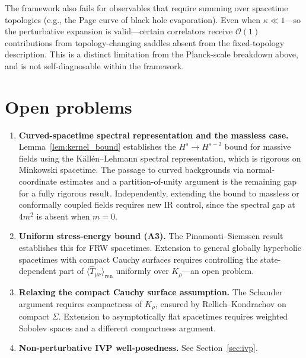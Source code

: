 \documentclass[12pt,a4paper]{article}
\begin{document}
The framework also fails for observables that require summing over spacetime topologies
(e.g., the Page curve of black hole evaporation). Even when $\kappa \ll 1$---so the
perturbative expansion is valid---certain correlators receive $\mathcal{O}(1)$
contributions from topology-changing saddles absent from the fixed-topology
description. This is a distinct limitation from the Planck-scale breakdown above, and is
not self-diagnosable within the framework.

\section{Open problems}
\label{sec:open}

\begin{enumerate}

\item \textbf{Curved-spacetime spectral representation and the massless case.}
Lemma~\ref{lem:kernel_bound} establishes the $H^s \to H^{s-2}$ bound for massive fields
using the K\"all\'en--Lehmann spectral representation, which is rigorous on Minkowski
spacetime. The passage to curved backgrounds via normal-coordinate estimates and a
partition-of-unity argument is the remaining gap for a fully rigorous result. Independently,
extending the bound to massless or conformally coupled fields requires new IR control,
since the spectral gap at $4m^2$ is absent when $m = 0$.

\item \textbf{Uniform stress-energy bound (A3).} The Pinamonti--Siemssen
result~\cite{pinamonti_siemssen} establishes this for FRW spacetimes. Extension to general
globally hyperbolic spacetimes with compact Cauchy surfaces requires controlling the
state-dependent part of $\langle\hat{T}_{\mu\nu}\rangle_{\text{ren}}$ uniformly over
$K_\rho$---an open problem.

\item \textbf{Relaxing the compact Cauchy surface assumption.} The Schauder argument
requires compactness of $K_\rho$, ensured by Rellich--Kondrachov on compact $\Sigma$.
Extension to asymptotically flat spacetimes requires weighted Sobolev spaces and a
different compactness argument.

\item \textbf{Non-perturbative IVP well-posedness.} See Section~\ref{sec:ivp}.

\end{enumerate}
\end{document}
